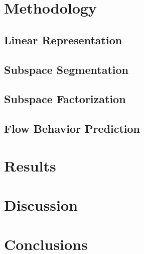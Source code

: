 \documentclass[conference]{IEEEtran}
\begin{document}


\vfill
\break

\section{Methodology}

\subsection{Linear Representation}

\subsection{Subspace Segmentation}

\subsection{Subspace Factorization}

\subsection{Flow Behavior Prediction}

\section{Results}

\section{Discussion}

\section{Conclusions}


\end{document}
